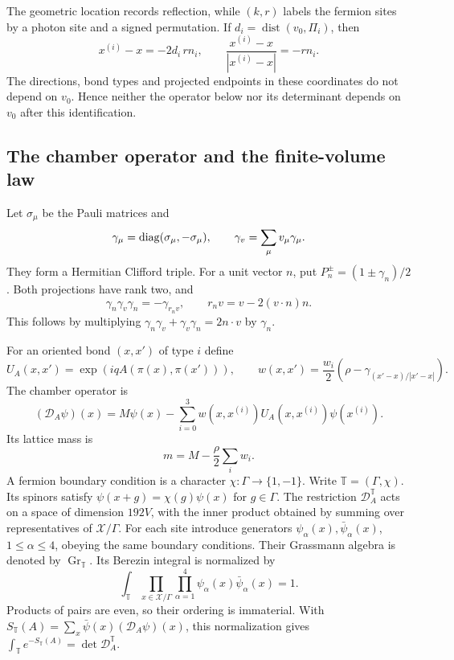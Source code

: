 The geometric location records reflection, while $(k,r)$ labels the
fermion sites by a photon site and a signed permutation. If
$d_i=\operatorname{dist}(v_0,\Pi_i)$, then
\[
 x^{(i)}-x=-2d_i\,rn_i,
 \qquad \frac{x^{(i)}-x}{|x^{(i)}-x|}=-rn_i.
\]
The directions, bond types and projected endpoints in these
coordinates do not depend on $v_0$. Hence neither the operator below
nor its determinant depends on $v_0$ after this identification.
\subsection{The chamber operator and the finite-volume law}
\label{subsec:reg-law}

Let $\sigma_\mu$ be the Pauli matrices and
\[
 \gamma_\mu=\operatorname{diag}(\sigma_\mu,-\sigma_\mu),\qquad
 \gamma_v=\sum_\mu v_\mu\gamma_\mu.
\]
They form a Hermitian Clifford triple. For a unit vector $n$, put
$P_n^\pm=(1\pm\gamma_n)/2$. Both projections have rank two, and
\begin{equation}\label{eq:reg-clifford-reflection}
 \gamma_n\gamma_v\gamma_n=-\gamma_{r_nv},\qquad
 r_nv=v-2(v\cdot n)n.
\end{equation}
This follows by multiplying
$\gamma_n\gamma_v+\gamma_v\gamma_n=2n\cdot v$ by $\gamma_n$.

For an oriented bond $(x,x')$ of type $i$ define
\begin{equation}\label{eq:reg-hop}
 U_A(x,x')=\exp(iqA(\pi(x),\pi(x'))),\qquad
 w(x,x')=\frac{w_i}{2}\left(\rho-\gamma_{(x'-x)/|x'-x|}\right).
\end{equation}
The chamber operator is
\begin{equation}\label{eq:reg-dirac}
 (\mathcal D_A\psi)(x)=M\psi(x)-\sum_{i=0}^3
                   w(x,x^{(i)})U_A(x,x^{(i)})\psi(x^{(i)}).
\end{equation}
Its lattice mass is
\begin{equation}\label{eq:reg-lattice-mass}
 m=M-\frac\rho2\sum_iw_i.
\end{equation}
A fermion boundary condition is a character
$\chi:\Gamma\to\{1,-1\}$. Write $\mathbb T=(\Gamma,\chi)$.
Its spinors satisfy $\psi(x+g)=\chi(g)\psi(x)$ for $g\in\Gamma$.
The restriction $\mathcal D_A^{\mathbb T}$ acts on a space of dimension $192V$,
with the inner product obtained by summing over representatives of
$\mathcal X/\Gamma$. For each site introduce generators
$\psi_\alpha(x),\bar\psi_\alpha(x)$, $1\le\alpha\le4$, obeying the same
boundary conditions. Their Grassmann algebra is denoted by
$\operatorname{Gr}_{\mathbb T}$. Its Berezin integral is normalized by
\begin{equation}\label{eq:reg-berezin}
 \int_{\mathbb T}\prod_{x\in\mathcal X/\Gamma}
                  \prod_{\alpha=1}^4\psi_\alpha(x)\bar\psi_\alpha(x)=1.
\end{equation}
Products of pairs are even, so their ordering is immaterial. With
$S_{\mathbb T}(A)=\sum_x\bar\psi(x)(\mathcal D_A\psi)(x)$, this normalization
gives $\int_{\mathbb T}e^{-S_{\mathbb T}(A)}=\det \mathcal D_A^{\mathbb T}$.

